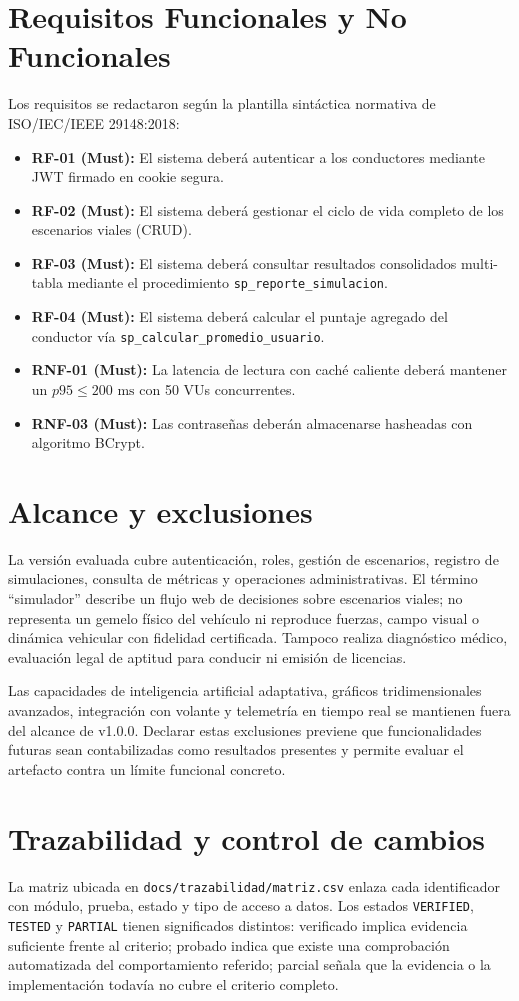 \documentclass[11pt,a4paper]{report}
\begin{document}
\section{Requisitos Funcionales y No Funcionales}
Los requisitos se redactaron según la plantilla sintáctica normativa de ISO/IEC/IEEE 29148:2018:
\begin{itemize}
    \item \textbf{RF-01 (Must):} El sistema deberá autenticar a los conductores mediante JWT firmado en cookie segura.
    \item \textbf{RF-02 (Must):} El sistema deberá gestionar el ciclo de vida completo de los escenarios viales (CRUD).
    \item \textbf{RF-03 (Must):} El sistema deberá consultar resultados consolidados multi-tabla mediante el procedimiento \texttt{sp\_reporte\_simulacion}.
    \item \textbf{RF-04 (Must):} El sistema deberá calcular el puntaje agregado del conductor vía \texttt{sp\_calcular\_promedio\_usuario}.
    \item \textbf{RNF-01 (Must):} La latencia de lectura con caché caliente deberá mantener un $p95 \le 200\text{ ms}$ con 50 VUs concurrentes.
    \item \textbf{RNF-03 (Must):} Las contraseñas deberán almacenarse hasheadas con algoritmo BCrypt.
\end{itemize}

\section{Alcance y exclusiones}
La versión evaluada cubre autenticación, roles, gestión de escenarios, registro de simulaciones, consulta de métricas y operaciones administrativas. El término ``simulador'' describe un flujo web de decisiones sobre escenarios viales; no representa un gemelo físico del vehículo ni reproduce fuerzas, campo visual o dinámica vehicular con fidelidad certificada. Tampoco realiza diagnóstico médico, evaluación legal de aptitud para conducir ni emisión de licencias.

Las capacidades de inteligencia artificial adaptativa, gráficos tridimensionales avanzados, integración con volante y telemetría en tiempo real se mantienen fuera del alcance de v1.0.0. Declarar estas exclusiones previene que funcionalidades futuras sean contabilizadas como resultados presentes y permite evaluar el artefacto contra un límite funcional concreto.

\section{Trazabilidad y control de cambios}
La matriz ubicada en \texttt{docs/trazabilidad/matriz.csv} enlaza cada identificador con módulo, prueba, estado y tipo de acceso a datos. Los estados \texttt{VERIFIED}, \texttt{TESTED} y \texttt{PARTIAL} tienen significados distintos: verificado implica evidencia suficiente frente al criterio; probado indica que existe una comprobación automatizada del comportamiento referido; parcial señala que la evidencia o la implementación todavía no cubre el criterio completo.
\end{document}
